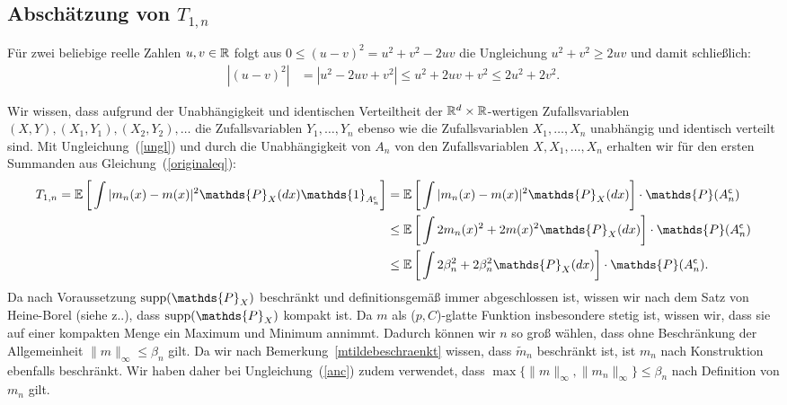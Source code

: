\subsection{Abschätzung von $T_{1,n}$}

Für zwei beliebige reelle Zahlen $u, v \in \mathbb{R}$ folgt aus $0 \leq (u - v)^2 = u^2 + v^2 - 2uv$ die Ungleichung $u^2 + v^2 \geq 2uv$ und damit schließlich:
\begin{equation}
\label{ungl}
\begin{split}
|(u - v)^2| & = |u^2 - 2uv + v^2|
\leq  u^2 + 2uv + v^2
\leq 2u^2 + 2v^2.
\end{split}
\end{equation}

Wir wissen, dass aufgrund der Unabhängigkeit und identischen Verteiltheit der $\mathbb{R}^d \times \mathbb{R}$-wertigen Zufallsvariablen  $(X, Y), (X_1, Y_1), (X_2, Y_2), \dots$ die Zufallsvariablen $Y_1,\dots,Y_n$ ebenso wie die Zufallsvariablen $X_1,\dots,X_n$ unabhängig und identisch verteilt sind. 
Mit Ungleichung~(\ref{ungl}) und durch die Unabhängigkeit von $A_n$ von den Zufallsvariablen $X, X_1, \dots, X_n$ erhalten wir für den ersten Summanden aus Gleichung~(\ref{originaleq}):
\begin{equation}
\label{anc}
\begin{split}
 T_{1,n} = \E \bigg[\int |m_n(x) - m(x)|^2 \mathds{P}_X(dx) \mathds{1}_{A_n^{\mathsf{c}}}\bigg] & =  \E \bigg[\int |m_n(x) - m(x)|^2 \mathds{P}_X(dx) \bigg] \cdot \mathds{P}(A_n^{\mathsf{c}}) \\
 & \leq \E \bigg[\int 2m_n(x)^2 + 2m(x)^2 \mathds{P}_X(dx)\bigg] \cdot \mathds{P}(A_n^{\mathsf{c}})\\
 & \leq \E \bigg[\int  2\beta_n^2 + 2\beta_n^2 \mathds{P}_X(dx)\bigg] \cdot \mathds{P}(A_n^{\mathsf{c}}).
\end{split}
\end{equation}
Da nach Voraussetzung $\supp(\mathds{P}_X)$ beschränkt und definitionsgemäß immer abgeschlossen ist, wissen wir nach dem Satz von Heine-Borel (siehe z.\@B.\@ \cite[Satz 5]{forster2016}), dass $\supp(\mathds{P}_X)$ kompakt ist. Da $m$ als ($p,C$)-glatte Funktion insbesondere stetig ist, wissen wir, dass sie auf einer kompakten Menge ein Maximum und Minimum annimmt. Dadurch können wir $n$ so groß wählen, dass ohne Beschränkung der Allgemeinheit $\|m\|_{\infty} \leq \beta_n$ gilt.
Da wir nach Bemerkung~\ref{mtildebeschraenkt} wissen, dass $\tilde{m}_n$ beschränkt ist, ist $m_n$ nach Konstruktion ebenfalls beschränkt. Wir haben daher bei Ungleichung~(\ref{anc}) zudem verwendet, dass $\max\{\|m\|_{\infty}, \|m_n\|_{\infty}\} \leq \beta_n$ nach Definition von $m_n$ gilt. 

